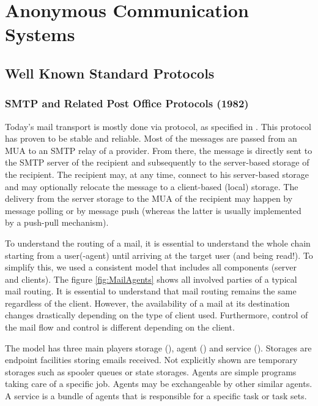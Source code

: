 
\part{Anonymous Communication Systems\label{sec:systems}}
\chapter{Well Known Standard Protocols}
\section*{SMTP and Related Post Office Protocols (1982)}
Today's mail transport is mostly done via  protocol, as specified in \cite{RFC5321}. This protocol has proven to be stable and reliable. Most of the messages are passed from an MUA to an SMTP relay of a provider. From there, the message is directly sent to the SMTP server of the recipient and subsequently to the server-based storage of the recipient. The recipient may, at any time, connect to his server-based storage and may optionally relocate the message to a client-based (local) storage. The delivery from the server storage to the MUA of the recipient may happen by message polling or by message push (whereas the latter is usually implemented by a push-pull mechanism).

To understand the routing of a mail, it is essential to understand the whole chain starting from a user(-agent) until arriving at the target user (and being read!). To simplify this, we used a consistent model that includes all components (server and clients). The figure \ref{fig:MailAgents} shows all involved parties of a typical mail routing. It is essential to understand that mail routing remains the same regardless of the client. However, the availability of a mail at its destination changes drastically depending on the type of client used. Furthermore, control of the mail flow and control is different depending on the client.

The model has three main players storage (), agent () and service (). Storages are endpoint facilities storing emails received. Not explicitly shown are temporary storages such as spooler queues or state storages. Agents are simple programs taking care of a specific job. Agents may be exchangeable by other similar agents. A service is a bundle of agents that is responsible for a specific task or task sets.

